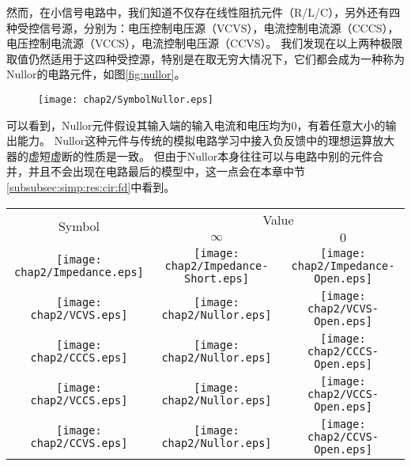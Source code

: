 然而，在小信号电路中，我们知道不仅存在线性阻抗元件（R/L/C），另外还有四种受控信号源，分别为：电压控制电压源（VCVS），电流控制电流源（CCCS），电压控制电流源（VCCS），电流控制电压源（CCVS）。
我们发现在以上两种极限取值仍然适用于这四种受控源，特别是在取无穷大情况下，它们都会成为一种称为Nullor的电路元件，如图\ref{fig:nullor}。

\begin{figure}[!htp]
	\centering
	\texttt{[image: chap2/SymbolNullor.eps]}
\end{figure}

可以看到，Nullor元件假设其输入端的输入电流和电压均为0，有着任意大小的输出能力。
Nullor这种元件与传统的模拟电路学习中接入负反馈中的理想运算放大器的虚短虚断的性质是一致。
但由于Nullor本身往往可以与电路中别的元件合并，并且不会出现在电路最后的模型中，这一点会在本章中节\ref{subsubsec:simp:res:cir:fd}中看到。

\begin{table}[!htbp]
	\centering
	\begin{tabular}{c|c|c}
		\hline
		\multirow{2}{*}{Symbol} & \multicolumn{2}{c}{Value}\\
		\cline{2-3} 
		& $\infty$ & $0$\\
		\hline
		\parbox[c]{0.11\textwidth}{\texttt{[image: chap2/Impedance.eps]}} & 
		\parbox[c]{0.11\textwidth}{\texttt{[image: chap2/Impedance-Short.eps]}} & 
		\parbox[c]{0.11\textwidth}{\texttt{[image: chap2/Impedance-Open.eps]}} \\
		\hline
		\parbox[c]{0.2\textwidth}{\texttt{[image: chap2/VCVS.eps]}} & 
		\parbox[c]{0.11\textwidth}{\texttt{[image: chap2/Nullor.eps]}} & 
		\parbox[c]{0.11\textwidth}{\texttt{[image: chap2/VCVS-Open.eps]}} \\
		\hline
		\parbox[c]{0.2\textwidth}{\texttt{[image: chap2/CCCS.eps]}} & 
		\parbox[c]{0.11\textwidth}{\texttt{[image: chap2/Nullor.eps]}} & 
		\parbox[c]{0.11\textwidth}{\texttt{[image: chap2/CCCS-Open.eps]}} \\
		\hline
		\parbox[c]{0.2\textwidth}{\texttt{[image: chap2/VCCS.eps]}} & 
		\parbox[c]{0.11\textwidth}{\texttt{[image: chap2/Nullor.eps]}} & 
		\parbox[c]{0.11\textwidth}{\texttt{[image: chap2/VCCS-Open.eps]}} \\
		\hline
		\parbox[c]{0.2\textwidth}{\texttt{[image: chap2/CCVS.eps]}} & 
		\parbox[c]{0.11\textwidth}{\texttt{[image: chap2/Nullor.eps]}} & 
		\parbox[c]{0.11\textwidth}{\texttt{[image: chap2/CCVS-Open.eps]}} \\
		\hline
	\end{tabular}
\end{table}

